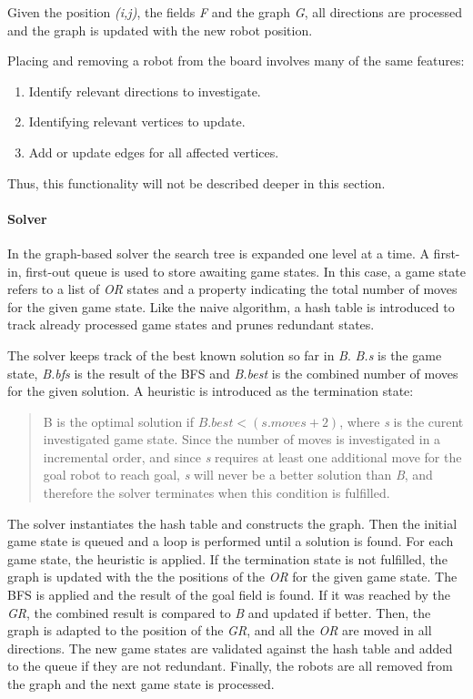 \documentclass[]{article}
\providecommand{\tightlist}{%
  \setlength{\itemsep}{0pt}\setlength{\parskip}{0pt}}
\let\oldparagraph\paragraph
\renewcommand{\paragraph}[1]{\oldparagraph{#1}\mbox{}}
\begin{document}
Given the position \emph{(i,j)}, the fields \emph{F} and the graph
\emph{G}, all directions are processed and the graph is updated with the
new robot position.

Placing and removing a robot from the board involves many of the same
features:

\begin{enumerate}
\def\labelenumi{\arabic{enumi}.}
\tightlist
\item
  Identify relevant directions to investigate.
\item
  Identifying relevant vertices to update.
\item
  Add or update edges for all affected vertices.
\end{enumerate}

Thus, this functionality will not be described deeper in this section.

\paragraph{Solver}\label{solver}

In the graph-based solver the search tree is expanded one level at a
time. A first-in, first-out queue is used to store awaiting game states.
In this case, a game state refers to a list of \emph{OR} states and a
property indicating the total number of moves for the given game state.
Like the naive algorithm, a hash table is introduced to track already
processed game states and prunes redundant states.

The solver keeps track of the best known solution so far in \emph{B}.
\emph{B.s} is the game state, \emph{B.bfs} is the result of the BFS and
\emph{B.best} is the combined number of moves for the given solution. A
heuristic is introduced as the termination state:

\begin{quote}
B is the optimal solution if \(B.best < (s.moves + 2)\), where \emph{s}
is the curent investigated game state. Since the number of moves is
investigated in a incremental order, and since \emph{s} requires at
least one additional move for the goal robot to reach goal, \emph{s}
will never be a better solution than \emph{B}, and therefore the solver
terminates when this condition is fulfilled.
\end{quote}

The solver instantiates the hash table and constructs the graph. Then
the initial game state is queued and a loop is performed until a
solution is found. For each game state, the heuristic is applied. If the
termination state is not fulfilled, the graph is updated with the the
positions of the \emph{OR} for the given game state. The BFS is applied
and the result of the goal field is found. If it was reached by the
\emph{GR}, the combined result is compared to \emph{B} and updated if
better. Then, the graph is adapted to the position of the \emph{GR}, and
all the \emph{OR} are moved in all directions. The new game states are
validated against the hash table and added to the queue if they are not
redundant. Finally, the robots are all removed from the graph and the
next game state is processed.
\end{document}
